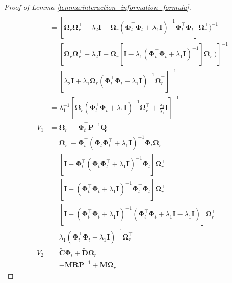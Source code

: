 \begin{proof}[Proof of Lemma \ref{lemma:interaction_information_formula}]
\begin{align*}
\\
            &= \left[\boldsymbol{\Omega}_r \boldsymbol{\Omega}_r^\top  + \lambda_2\mathbf{I} - \boldsymbol{\Omega}_r (\boldsymbol{\Phi}_t^\top \boldsymbol{\Phi}_t+ \lambda_1\mathbf{I})^{-1} \boldsymbol{\Phi}_t^\top \boldsymbol{\Phi}_t \right] \boldsymbol{\Omega}_r^\top)^{-1} 
\\ 
            &= \left[\boldsymbol{\Omega}_r \boldsymbol{\Omega}_r^\top  + \lambda_2\mathbf{I} - \boldsymbol{\Omega}_r \left[ \mathbf{I} - \lambda_1(\boldsymbol{\Phi}_t^\top \boldsymbol{\Phi}_t+ \lambda_1\mathbf{I})^{-1} \right] \boldsymbol{\Omega}_r^\top)\right]^{-1} 
\\ 
            &= \left[\lambda_2\mathbf{I} + \lambda_1\boldsymbol{\Omega}_r(\boldsymbol{\Phi}_t^\top \boldsymbol{\Phi}_t+ \lambda_1\mathbf{I})^{-1}\boldsymbol{\Omega}_r^\top\right]^{-1} 
\\
            &= \lambda_1^{-1} \left[\boldsymbol{\Omega}_r(\boldsymbol{\Phi}_t^\top \boldsymbol{\Phi}_t+ \lambda_1\mathbf{I})^{-1}\boldsymbol{\Omega}_r^\top + \frac{\lambda_2} {\lambda_1} \mathbf{I}\right]^{-1} 
\\
            V_1 & = \boldsymbol{\Omega}_r^\top - \boldsymbol{\Phi}_t^\top \mathbf{P}^{-1} \mathbf{Q}
\\
            & = \boldsymbol{\Omega}_r^\top - \boldsymbol{\Phi}_t^\top (\boldsymbol{\Phi}_t\boldsymbol{\Phi}_t^\top + \lambda_1\mathbf{I})^{-1} \boldsymbol{\Phi}_t \boldsymbol{\Omega}_r^\top 
\\
            &=\left[ \mathbf{I} - \boldsymbol{\Phi}_t^\top (\boldsymbol{\Phi}_t\boldsymbol{\Phi}_t^\top + \lambda_1\mathbf{I})^{-1} \boldsymbol{\Phi}_t\right] \boldsymbol{\Omega}_r^\top 
\\
            & = \left[ \mathbf{I} - (\boldsymbol{\Phi}_t^\top\boldsymbol{\Phi}_t + \lambda_1\mathbf{I})^{-1} \boldsymbol{\Phi}_t^\top\boldsymbol{\Phi}_t\right] \boldsymbol{\Omega}_r^\top 
\\
            & = \left[ \mathbf{I} - (\boldsymbol{\Phi}_t^\top\boldsymbol{\Phi}_t + \lambda_1\mathbf{I})^{-1} (\boldsymbol{\Phi}_t^\top\boldsymbol{\Phi}_t +\lambda_1 \mathbf{I} - \lambda_1 \mathbf{I})\right] \boldsymbol{\Omega}_r^\top 
\\
            & = \lambda_1(\boldsymbol{\Phi}_t^\top\boldsymbol{\Phi}_t + \lambda_1\mathbf{I})^{-1} \boldsymbol{\Omega}_r^\top 
\\
            V_2 & = \widetilde{\mathbf{C}}\boldsymbol{\Phi}_t  + \widetilde{\mathbf{D}}\boldsymbol{\Omega}_r 
\\
            & = -\mathbf{M}\mathbf{R}\mathbf{P}^{-1} + \mathbf{M}\boldsymbol{\Omega}_r 

\end{align*}
\end{proof}
